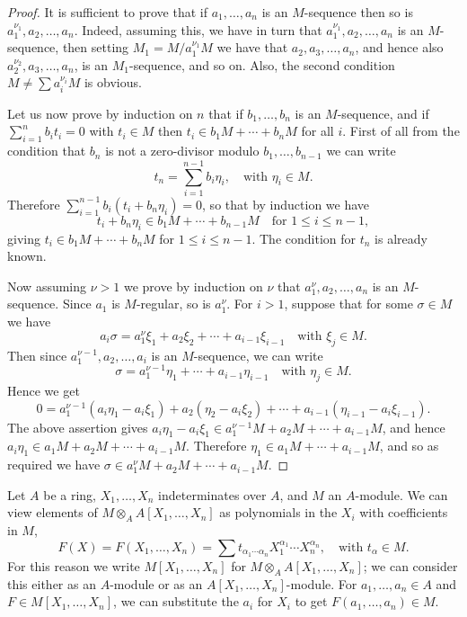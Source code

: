 \begin{proof}
It is sufficient to prove that if $a_1, \ldots, a_n$ is an $M$-sequence then so is
$a_1^{\nu_1}, a_2, \ldots, a_n$. Indeed, assuming this, we have in turn that $a_1^{\nu_1}, a_2, \ldots, a_n$
is an $M$-sequence, then setting $M_1 = M/a_1^{\nu_1}M$ we have that $a_2, a_3, \ldots, a_n$,
and hence also $a_2^{\nu_2}, a_3, \ldots, a_n$, is an $M_1$-sequence, and so on. Also, the
second condition $M \neq \sum a_i^{\nu_i}M$ is obvious.

Let us now prove by induction on $n$ that if $b_1, \ldots, b_n$ is an $M$-sequence,
and if $\sum_{i=1}^{n} b_it_i = 0$ with $t_i \in M$ then $t_i \in b_1M + \cdots + b_nM$ for all
$i$. First of all from the condition that $b_n$ is not a zero-divisor modulo
$b_1, \ldots, b_{n-1}$ we can write
\[
  t_n = \sum_{i=1}^{n-1} b_i\eta_i, \quad \text{with } \eta_i \in M.
\]
Therefore $\sum_{i=1}^{n-1} b_i(t_i + b_n\eta_i) = 0$, so that by induction we have
\[
  t_i + b_n\eta_i \in b_1M + \cdots + b_{n-1}M \quad \text{for } 1 \le i \le n - 1,
\]
giving $t_i \in b_1M + \cdots + b_nM$ for $1 \le i \le n - 1$. The condition for $t_n$ is already known.

Now assuming $\nu > 1$ we prove by induction on $\nu$ that $a_1^{\nu}, a_2, \ldots, a_n$ is
an $M$-sequence. Since $a_1$ is $M$-regular, so is $a_1^{\nu}$. For $i > 1$, suppose that
for some $\sigma \in M$ we have
\[
  a_i\sigma = a_1^{\nu}\xi_1 + a_2\xi_2 + \cdots + a_{i-1}\xi_{i-1} \quad \text{with } \xi_j \in M.
\]
Then since $a_1^{\nu-1}, a_2, \ldots, a_i$ is an $M$-sequence, we can write
\[
  \sigma = a_1^{\nu-1}\eta_1 + \cdots + a_{i-1}\eta_{i-1} \quad \text{with } \eta_j \in M.
\]
Hence we get
\[
  0 = a_1^{\nu-1}(a_i\eta_1 - a_i\xi_1) + a_2(\eta_2 - a_i\xi_2) + \cdots + a_{i-1}(\eta_{i-1} - a_i\xi_{i-1}).
\]
The above assertion gives $a_i\eta_1 - a_i\xi_1 \in a_1^{\nu-1}M + a_2M + \cdots + a_{i-1}M$,
and hence $a_i\eta_1 \in a_1M + a_2M + \cdots + a_{i-1}M$. Therefore $\eta_1 \in a_1M + \cdots +
a_{i-1}M$, and so as required we have $\sigma \in a_1^{\nu}M + a_2M + \cdots + a_{i-1}M$.
\end{proof}

Let $A$ be a ring, $X_1, \ldots, X_n$ indeterminates over $A$, and $M$ an $A$-module.
We can view elements of $M \otimes_A A[X_1, \ldots, X_n]$ as polynomials in the $X_i$
with coefficients in $M$,
\[
  F(X) = F(X_1, \ldots, X_n) = \sum t_{\alpha_1 \cdots \alpha_n}X_1^{\alpha_1} \cdots X_n^{\alpha_n}, \quad \text{with } t_{\alpha} \in M.
\]
For this reason we write $M[X_1, \ldots, X_n]$ for $M \otimes_A A[X_1, \ldots, X_n]$; we can
consider this either as an $A$-module or as an $A[X_1, \ldots, X_n]$-module. For
$a_1, \ldots, a_n \in A$ and $F \in M[X_1, \ldots, X_n]$, we can substitute the $a_i$ for $X_i$ to
get $F(a_1, \ldots, a_n) \in M$.

